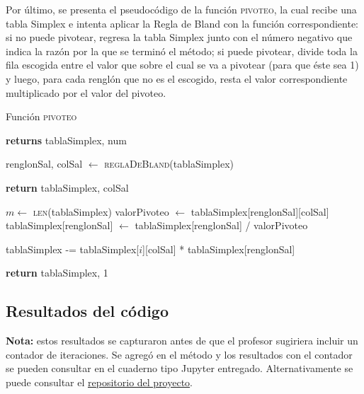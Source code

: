 \documentclass[12pt]{article}
\begin{document}
Por último, se presenta el pseudocódigo de la función \textsc{pivoteo}, la cual recibe una tabla Simplex e intenta aplicar la Regla de Bland con la función correspondiente: si no puede pivotear, regresa la tabla Simplex junto con el número negativo que indica la razón por la que se terminó el método; si puede pivotear, divide toda la fila escogida entre el valor que sobre el cual se va a pivotear (para que éste sea 1) y luego, para cada renglón que no es el escogido, resta el valor correspondiente multiplicado por el valor del pivoteo.
\begin{center}
    \begin{algorithm}[H]
    \caption{Función \textsc{pivoteo}}
    \begin{algorithmic}
     \textbf{returns} tablaSimplex, num

    \State renglonSal, colSal $\gets$ \textsc{reglaDeBland}(tablaSimplex)

     
        \State \textbf{return} tablaSimplex, colSal
    \EndIf

    \State $m \gets$ \textsc{len}(tablaSimplex)
    \State valorPivoteo $\gets$ tablaSimplex[renglonSal][colSal]
    \State tablaSimplex[renglonSal] $\gets$ tablaSimplex[renglonSal] / valorPivoteo
    
            \State tablaSimplex -= tablaSimplex[$i$][colSal] * tablaSimplex[renglonSal]        
        \EndIf
    \EndFor

    \State \textbf{return} tablaSimplex, 1

    \EndFunction
    \end{algorithmic}
    \end{algorithm}
\end{center}

\subsection{Resultados del código}
\textbf{Nota:} estos resultados se capturaron antes de que el profesor sugiriera incluir un contador de iteraciones. Se agregó en el método y los resultados con el contador se pueden consultar en el cuaderno tipo Jupyter entregado. Alternativamente se puede consultar el \href{https://github.com/betomqz/progra-lineal-proyecto}{repositorio del proyecto}. 
\end{document}
